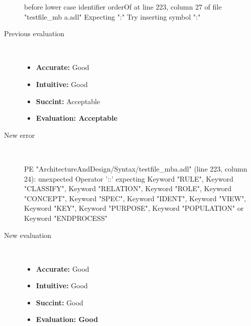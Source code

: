 \begin{description}
\begin{haskell}
before lower case identifier orderOf at line 223, column 27 of file "testfile_mb
a.adl"
Expecting ":"
Try inserting symbol ":"\end{haskell}
  \item[Previous evaluation]~\\
    \begin{itemize}
    \item \textbf{Accurate:} Good
    \item \textbf{Intuitive:} Good
    \item \textbf{Succint:} Acceptable
    \item \textbf{Evaluation: Acceptable}
    \end{itemize}
  \item[New error]~\\
\begin{haskell}
PE "ArchitectureAndDesign/Syntax/testfile_mba.adl" (line 223, column 24):
unexpected Operator '::'
expecting Keyword "RULE", Keyword "CLASSIFY", Keyword "RELATION", Keyword "ROLE", Keyword "CONCEPT", Keyword "SPEC", Keyword "IDENT", Keyword "VIEW", Keyword "KEY", Keyword "PURPOSE", Keyword "POPULATION" or Keyword "ENDPROCESS"\end{haskell}
  \item[New evaluation]~\\
    \begin{itemize}
    \item \textbf{Accurate:} Good
    \item \textbf{Intuitive:} Good
    \item \textbf{Succint:} Good
    \item \textbf{Evaluation: Good
}
    \end{itemize}
  \end{description}

\hrulefill

